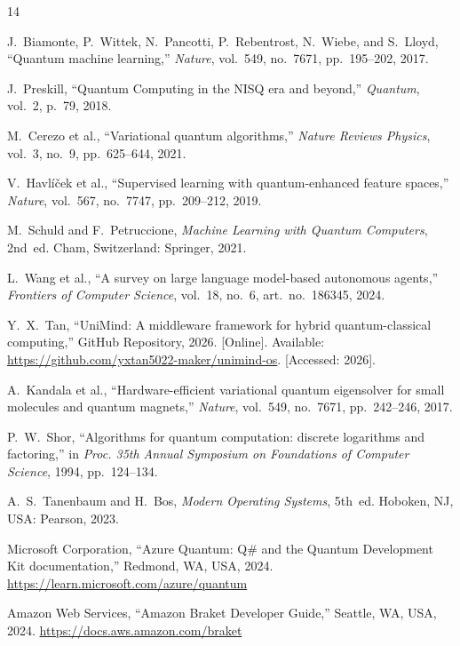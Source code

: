 ﻿\documentclass[12pt,a4paper]{article}
\begin{document}
\newpage
\begin{thebibliography}{14}

J.~Biamonte, P.~Wittek, N.~Pancotti, P.~Rebentrost, N.~Wiebe, and S.~Lloyd,
``Quantum machine learning,''
\textit{Nature}, vol.~549, no.~7671, pp.~195--202, 2017.

J.~Preskill,
``Quantum Computing in the NISQ era and beyond,''
\textit{Quantum}, vol.~2, p.~79, 2018.

M.~Cerezo et al.,
``Variational quantum algorithms,''
\textit{Nature Reviews Physics}, vol.~3, no.~9, pp.~625--644, 2021.

V.~Havl\'{i}\v{c}ek et al.,
``Supervised learning with quantum-enhanced feature spaces,''
\textit{Nature}, vol.~567, no.~7747, pp.~209--212, 2019.

M.~Schuld and F.~Petruccione,
\textit{Machine Learning with Quantum Computers}, 2nd~ed.
Cham, Switzerland: Springer, 2021.

L.~Wang et al.,
``A survey on large language model-based autonomous agents,''
\textit{Frontiers of Computer Science}, vol.~18, no.~6, art.~no.~186345, 2024.

Y.~X.~Tan,
``UniMind: A middleware framework for hybrid quantum-classical computing,''
GitHub Repository, 2026.
[Online]. Available: \url{https://github.com/yxtan5022-maker/unimind-os}.
[Accessed: 2026].

A.~Kandala et al.,
``Hardware-efficient variational quantum eigensolver for small molecules and quantum magnets,''
\textit{Nature}, vol.~549, no.~7671, pp.~242--246, 2017.

P.~W.~Shor,
``Algorithms for quantum computation: discrete logarithms and factoring,''
in \textit{Proc. 35th Annual Symposium on Foundations of Computer Science},
1994, pp.~124--134.

A.~S.~Tanenbaum and H.~Bos,
\textit{Modern Operating Systems}, 5th~ed.
Hoboken, NJ, USA: Pearson, 2023.

Microsoft Corporation,
``Azure Quantum: Q\# and the Quantum Development Kit documentation,''
Redmond, WA, USA, 2024.
\url{https://learn.microsoft.com/azure/quantum}

Amazon Web Services,
``Amazon Braket Developer Guide,''
Seattle, WA, USA, 2024.
\url{https://docs.aws.amazon.com/braket}


\end{thebibliography}
\end{document}
